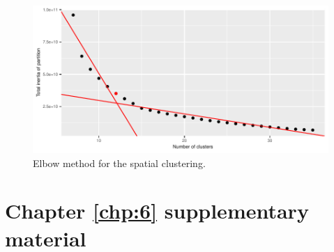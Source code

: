 \begin{appendices}
\begin{figure}[H]
  \centering
  \includegraphics[]{figs/Chap5/Elb_clust.pdf}
  \caption{Elbow method for the spatial clustering.}
  \label{fig:elb:clust}
\end{figure}

\chapter{Chapter \ref{chp:6} supplementary material} \label{app:chap6}



\end{appendices}